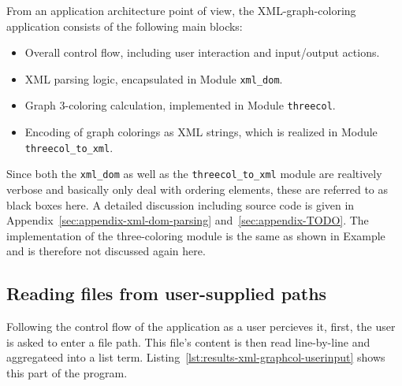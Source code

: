 From an application architecture point of view, the XML-graph-coloring application consists of the following main blocks:
\begin{itemize}
    \item Overall control flow, including user interaction and input/output actions.
    \item XML parsing logic, encapsulated in Module \texttt{xml\_dom}.
    \item Graph 3-coloring calculation, implemented in Module \texttt{threecol}.
    \item Encoding of graph colorings as XML strings, which is realized in Module \texttt{threecol\_to\_xml}.
\end{itemize}    
Since both the \texttt{xml\_dom} as well as the \texttt{threecol\_to\_xml} module are realtively verbose and basically only deal with ordering elements, these are referred to as black boxes here. A detailed discussion including source code is given in Appendix~\ref{sec:appendix-xml-dom-parsing} and~\ref{sec:appendix-TODO}. The implementation of the three-coloring module is the same as shown in Example and is therefore not discussed again here.

\subsection{Reading files from user-supplied paths}

Following the control flow of the application as a user percieves it, first, the user is asked to enter a file path. This file's content is then read line-by-line and aggregateed into a list term. Listing~\ref{lst:results-xml-graphcol-userinput} shows this part of the program.

